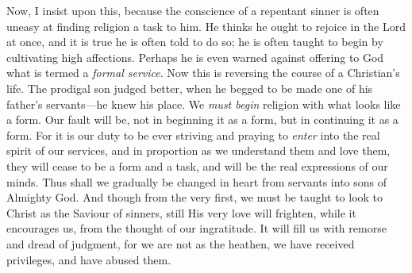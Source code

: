 Now, I insist upon this, because the conscience of a repentant
sinner is often uneasy at finding religion a task to him. He thinks he
ought to rejoice in the Lord at once, and it is true he is often told
to do so; he is often taught to begin by cultivating high affections.
Perhaps he is even warned against offering to God what is termed a \emph{formal
service}. Now this is reversing the course of a Christian's life.
The prodigal son judged better, when he begged to be made one of his
father's servants—he knew his place. We \emph{must begin} religion
with what looks like a form. Our fault will be, not in beginning it as
a form, but in continuing it as a form. For it is our duty to be ever
striving and praying to \emph{enter} into the real spirit of our
services, and in proportion as we understand them and love them, they
will cease to be a form and a task, and will be the real expressions
of our minds. Thus shall we gradually be changed in heart from
servants into sons of Almighty God. And though from the very first, we
must be taught to look to Christ as the Saviour of sinners, still His
very love will frighten, while it encourages us, from the thought of
our ingratitude. It will fill us with remorse and dread of judgment,
for we are not as the heathen, we have received privileges, and have
abused them.


